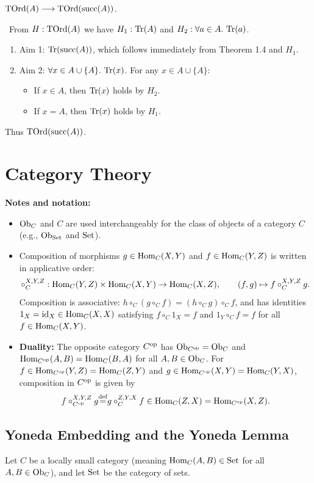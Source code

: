\documentclass[10pt,a4paper]{article}
\begin{document}
\begin{theorem}
${\textrm{TOrd}}(A) \longrightarrow {\textrm{TOrd}}({\textrm{succ}}(A))$.
\end{theorem}
\myprf\ From $H: {\textrm{TOrd}}(A)$ we have $H_1: {\textrm{Tr}}(A)$ and $H_2: \forall a\in A.\ {\textrm{Tr}}(a)$.
\begin{enumerate}
\item Aim 1: ${\textrm{Tr}}({\textrm{succ}}(A))$, which follows immediately from Theorem 1.4 and $H_1$.
\item Aim 2: $\forall x\in A\cup\{A\}.\ \Tr(x)$. For any $x \in A \cup \{A\}$:
  \begin{itemize}
  \item If $x\in A$, then ${\textrm{Tr}}(x)$ holds by $H_2$.
  \item If $x = A$, then ${\textrm{Tr}}(x)$ holds by $H_1$.
  \end{itemize}
\end{enumerate}
Thus ${\textrm{TOrd}}({\textrm{succ}}(A))$. \myqed
\section{Category Theory}
\noindent\textbf{Notes and notation:}
\begin{itemize}
\item ${\textrm{Ob}}_C$ and $C$ are used interchangeably for the class of objects of a category $C$ (e.g., ${\textrm{Ob}}_{\textrm{Set}}$ and ${\textrm{Set}}$).
\item Composition of morphisms $g \in {\textrm{Hom}}_C(X,Y)$ and $f \in {\textrm{Hom}}_C(Y,Z)$ is written in applicative order:
$$\circ_C^{X,Y,Z} : {\textrm{Hom}}_C(Y,Z) \times {\textrm{Hom}}_C(X,Y) \to {\textrm{Hom}}_C(X,Z), \qquad (f, g) \mapsto f \circ_C^{X,Y,Z} g.$$
Composition is associative: $h \circ_C (g \circ_C f) = (h \circ_C g) \circ_C f$, and has identities $1_X = {\textrm{id}}_X \in {\textrm{Hom}}_C(X,X)$ satisfying $f \circ_C 1_X = f$ and $1_Y \circ_C f = f$ for all $f \in {\textrm{Hom}}_C(X,Y)$.
\item \textbf{Duality:} The opposite category $C^{\textrm{op}}$ has ${\textrm{Ob}}_{C^{\textrm{op}}} = {\textrm{Ob}}_C$ and ${\textrm{Hom}}_{C^{\textrm{op}}}(A,B) = {\textrm{Hom}}_C(B,A)$ for all $A,B \in {\textrm{Ob}}_C$. For $f \in {\textrm{Hom}}_{C^{\textrm{op}}}(Y,Z) = {\textrm{Hom}}_C(Z,Y)$ and $g \in {\textrm{Hom}}_{C^{\textrm{op}}}(X,Y) = {\textrm{Hom}}_C(Y,X)$, composition in $C^{\textrm{op}}$ is given by
$$f \circ_{C^{\textrm{op}}}^{X,Y,Z} g {\stackrel{{\textrm{def}}}{=}} g \circ_C^{Z,Y,X} f \in {\textrm{Hom}}_C(Z,X) = {\textrm{Hom}}_{C^{\textrm{op}}}(X,Z).$$
\end{itemize}

\subsection{Yoneda Embedding and the Yoneda Lemma}
Let $C$ be a locally small category (meaning ${\textrm{Hom}}_C(A,B) \in {\textrm{Set}}$ for all $A,B \in {\textrm{Ob}}_C$), and let ${\textrm{Set}}$ be the category of sets.
\end{document}
